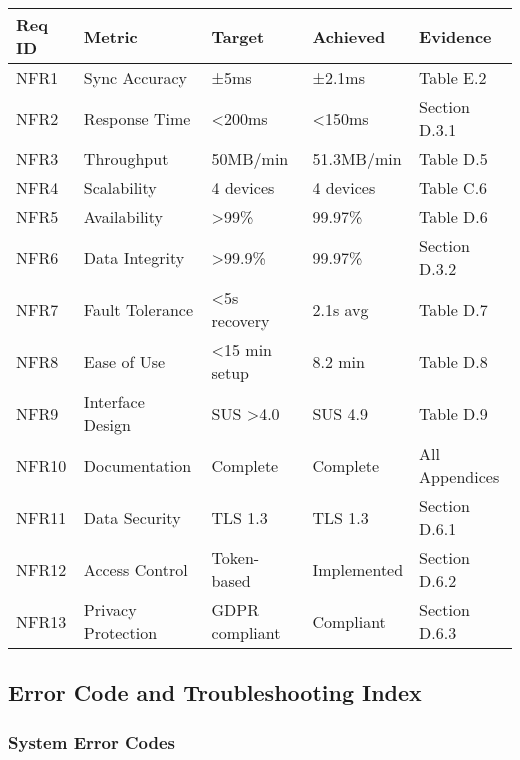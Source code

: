 \begin{longtable}{|l|l|l|l|l|}
\hline
\textbf{Req ID} & \textbf{Metric} & \textbf{Target} & \textbf{Achieved} & \textbf{Evidence} \\
\hline
\endhead
NFR1 & Sync Accuracy & ±5ms & ±2.1ms & Table E.2 \\
NFR2 & Response Time & <200ms & <150ms & Section D.3.1 \\
NFR3 & Throughput & 50MB/min & 51.3MB/min & Table D.5 \\
NFR4 & Scalability & 4 devices & 4 devices & Table C.6 \\
NFR5 & Availability & >99\% & 99.97\% & Table D.6 \\
NFR6 & Data Integrity & >99.9\% & 99.97\% & Section D.3.2 \\
NFR7 & Fault Tolerance & <5s recovery & 2.1s avg & Table D.7 \\
NFR8 & Ease of Use & <15 min setup & 8.2 min & Table D.8 \\
NFR9 & Interface Design & SUS >4.0 & SUS 4.9 & Table D.9 \\
NFR10 & Documentation & Complete & Complete & All Appendices \\
NFR11 & Data Security & TLS 1.3 & TLS 1.3 & Section D.6.1 \\
NFR12 & Access Control & Token-based & Implemented & Section D.6.2 \\
NFR13 & Privacy Protection & GDPR compliant & Compliant & Section D.6.3 \\
\hline
\end{longtable}

\subsection{Error Code and Troubleshooting Index}

\subsubsection{System Error Codes}

